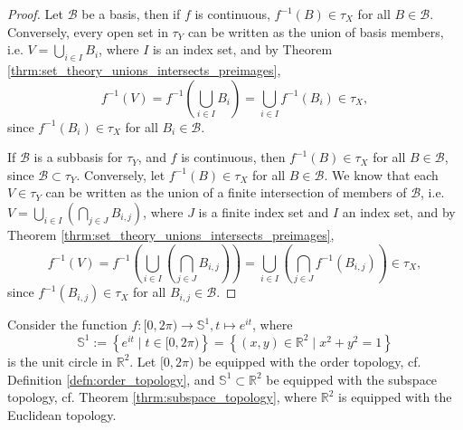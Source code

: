\begin{proof}
	Let $\mathscr B$ be a basis, then if $f$ is continuous, $f^{-1}(B)\in\tau_X$ for all $B\in \mathscr B$. Conversely, every open set in $\tau_Y$ can be written as the union of basis members, i.e. $V = \bigcup_{i\in I}B_i$, where $I$ is an index set, and by Theorem \ref{thrm:set_theory_unions_intersects_preimages}, $$f^{-1}(V) = f^{-1}\left(\bigcup_{i\in I}B_i\right) = \bigcup_{i\in I}f^{-1}(B_i)\in \tau_X,$$ since $f^{-1}(B_i)\in\tau_X$ for all $B_i\in\mathscr B$.
	
	If $\mathscr B$ is a subbasis for $\tau_Y$, and $f$ is continuous, then $f^{-1}(B)\in \tau_X$ for all $B\in\mathscr B$, since $\mathscr B\subset \tau_Y$. Conversely, let $f^{-1}(B) \in \tau_X$ for all $B\in\mathscr B$. We know that each $V\in \tau_Y$ can be written as the union of a finite intersection of members of $\mathscr B$, i.e. $V = \bigcup_{i\in I}\left(\bigcap_{j\in J}B_{i, j}\right)$, where $J$ is a finite index set and $I$ an index set, and by Theorem \ref{thrm:set_theory_unions_intersects_preimages},
	$$f^{-1}(V) = f^{-1}\left(\bigcup_{i\in I}\left(\bigcap_{j\in J}B_{i, j}\right)\right) = \bigcup_{i\in I}\left(\bigcap_{j\in J}f^{-1}(B_{i, j})\right)\in \tau_X,$$
	since $f^{-1}(B_{i, j})\in \tau_X$ for all $B_{i, j}\in \mathscr B$.
\end{proof}

\begin{exmp}
	Consider the function $f: [0, 2\pi)\to \mathbb S^1, t\mapsto e^{it}$, where $$\mathbb S^1 := \left\{e^{it} \mid t\in [0, 2\pi)\right\} = \left\{(x, y)\in\mathbb R^2 \mid x^2 + y^2  = 1\right\}$$ is the unit circle in $\mathbb R^2$. Let $[0, 2\pi)$ be equipped with the order topology, cf. Definition \ref{defn:order_topology}, and $\mathbb S^1\subset\mathbb R^2$ be equipped with the subspace topology, cf. Theorem \ref{thrm:subspace_topology}, where $\mathbb R^2$ is equipped with the Euclidean topology.
\end{exmp}

